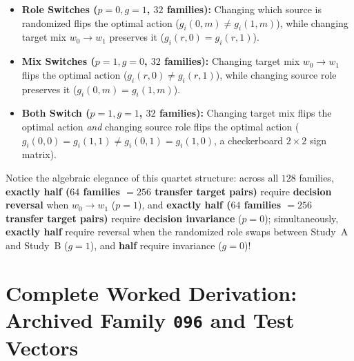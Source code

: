 \begin{enumerate}
\begin{itemize}
    \item \textbf{Role Switches ($p=0, g=1$, $32$ families):} Changing which source is randomized flips the optimal action ($g_i(0,m) \neq g_i(1,m)$), while changing target mix $w_0 \to w_1$ preserves it ($g_i(r,0) = g_i(r,1)$).
    \item \textbf{Mix Switches ($p=1, g=0$, $32$ families):} Changing target mix $w_0 \to w_1$ flips the optimal action ($g_i(r,0) \neq g_i(r,1)$), while changing source role preserves it ($g_i(0,m) = g_i(1,m)$).
    \item \textbf{Both Switch ($p=1, g=1$, $32$ families):} Changing target mix flips the optimal action \emph{and} changing source role flips the optimal action ($g_i(0,0) = g_i(1,1) \neq g_i(0,1) = g_i(1,0)$, a checkerboard $2\times 2$ sign matrix).
  \end{itemize}
\end{enumerate}

Notice the algebraic elegance of this quartet structure: across all $128$ families, \textbf{exactly half ($64$ families $= 256$ transfer target pairs)} require \textbf{decision reversal} when $w_0 \to w_1$ ($p=1$), and \textbf{exactly half ($64$ families $= 256$ transfer target pairs)} require \textbf{decision invariance} ($p=0$); simultaneously, \textbf{exactly half} require reversal when the randomized role swaps between Study~A and Study~B ($g=1$), and \textbf{half} require invariance ($g=0$)!

\section{Complete Worked Derivation: Archived Family \texttt{096} and Test Vectors}

